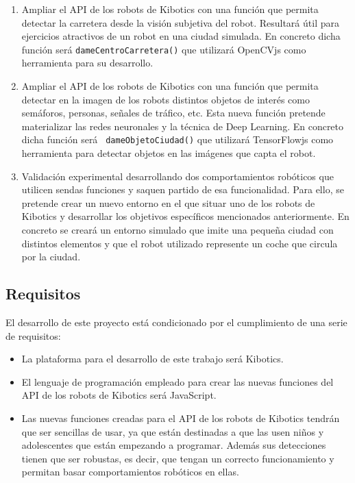 \documentclass{report}
\begin{document}
\begin{enumerate}
\item Ampliar el API de los robots de Kibotics con una función que permita detectar la carretera desde la visión subjetiva del robot. Resultará útil para ejercicios atractivos de un robot en una ciudad simulada. En concreto dicha función será \texttt{dameCentroCarretera()} que utilizará OpenCVjs como herramienta para su desarrollo.


\item Ampliar el API de los robots de Kibotics con una función que permita detectar en la imagen de los robots distintos objetos de interés como semáforos, personas, señales de tráfico, etc. Esta nueva función pretende materializar las redes neuronales y la técnica de Deep Learning. En concreto dicha función será \texttt{ dameObjetoCiudad()} que utilizará TensorFlowjs como herramienta para detectar objetos en las imágenes que capta el robot.

\item Validación experimental desarrollando dos comportamientos robóticos que utilicen sendas funciones y saquen partido de esa funcionalidad. Para ello, se pretende crear un nuevo entorno en el que situar uno de los robots de Kibotics y desarrollar los objetivos específicos mencionados anteriormente. En concreto se creará un entorno simulado que imite una pequeña ciudad con distintos elementos y que el robot utilizado represente un coche que circula por la ciudad.
\end{enumerate}

\subsection{Requisitos}
El desarrollo de este proyecto está condicionado por el cumplimiento de una serie de requisitos:

\begin{itemize}
\item La plataforma para el desarrollo de este trabajo será Kibotics.
\item El lenguaje de programación empleado para crear las nuevas funciones del API de los robots de Kibotics será JavaScript.
\item Las nuevas funciones creadas para el API de los robots de Kibotics tendrán que ser sencillas de usar, ya que están destinadas a que las usen niños y adolescentes que están empezando a programar. Además sus detecciones tienen que ser robustas, es decir, que tengan un correcto funcionamiento y permitan basar comportamientos robóticos en ellas.
\end{itemize}
\end{document}
